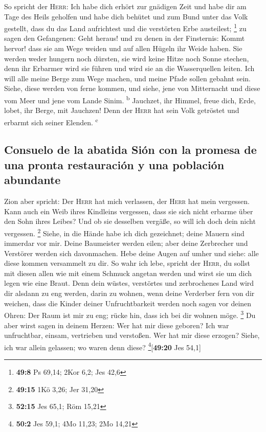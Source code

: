 So spricht der \textsc{Herr}: Ich habe dich erhört zur
gnädigen Zeit und habe dir am Tage des Heils geholfen und habe dich
behütet und zum Bund unter das Volk gestellt, dass du das Land
aufrichtest und die verstörten Erbe austeilest; \footnote{\textbf{49:8}
  Ps 69,14; 2Kor 6,2; Jes 42,6}  zu sagen den Gefangenen:
Geht heraus! und zu denen in der Finsternis: Kommt hervor! dass sie am
Wege weiden und auf allen Hügeln ihr Weide haben.  Sie
werden weder hungern noch dürsten, sie wird keine Hitze noch Sonne
stechen, denn ihr Erbarmer wird sie führen und wird sie an die
Wasserquellen leiten.  Ich will alle meine Berge zum Wege
machen, und meine Pfade sollen gebahnt sein.  Siehe,
diese werden von ferne kommen, und siehe, jene von Mitternacht und diese
vom Meer und jene vom Lande Sinim. \textsuperscript{b} 
Jauchzet, ihr Himmel, freue dich, Erde, lobet, ihr Berge, mit Jauchzen!
Denn der \textsc{Herr} hat sein Volk getröstet und erbarmt sich seiner
Elenden. \textsuperscript{c}

\hypertarget{consuelo-de-la-abatida-siuxf3n-con-la-promesa-de-una-pronta-restauraciuxf3n-y-una-poblaciuxf3n-abundante}{%
\subsection{Consuelo de la abatida Sión con la promesa de una pronta
restauración y una población
abundante}\label{consuelo-de-la-abatida-siuxf3n-con-la-promesa-de-una-pronta-restauraciuxf3n-y-una-poblaciuxf3n-abundante}}

 Zion aber spricht: Der \textsc{Herr} hat mich verlassen,
der \textsc{Herr} hat mein vergessen.  Kann auch ein Weib
ihres Kindleins vergessen, dass sie sich nicht erbarme über den Sohn
ihres Leibes? Und ob sie desselben vergäße, so will ich doch dein nicht
vergessen. \footnote{\textbf{49:15} 1Kö 3,26; Jer 31,20} 
Siehe, in die Hände habe ich dich gezeichnet; deine Mauern sind immerdar
vor mir.  Deine Baumeister werden eilen; aber deine
Zerbrecher und Verstörer werden sich davonmachen.  Hebe
deine Augen auf umher und siehe: alle diese kommen versammelt zu dir. So
wahr ich lebe, spricht der \textsc{Herr}, du sollst mit diesen allen wie
mit einem Schmuck angetan werden und wirst sie um dich legen wie eine
Braut.  Denn dein wüstes, verstörtes und zerbrochenes
Land wird dir alsdann zu eng werden, darin zu wohnen, wenn deine
Verderber fern von dir weichen,  dass die Kinder deiner
Unfruchtbarkeit werden noch sagen vor deinen Ohren: Der Raum ist mir zu
eng; rücke hin, dass ich bei dir wohnen möge. \footnote{\textbf{52:15}
  Jes 65,1; Röm 15,21}  Du aber wirst sagen in deinem
Herzen: Wer hat mir diese geboren? Ich war unfruchtbar, einsam,
vertrieben und verstoßen. Wer hat mir diese erzogen? Siehe, ich war
allein gelassen; wo waren denn diese? \footnote{\textbf{50:2} Jes 59,1;
  4Mo 11,23; 2Mo 14,21}{[}\textbf{49:20} Jes 54,1{]}

